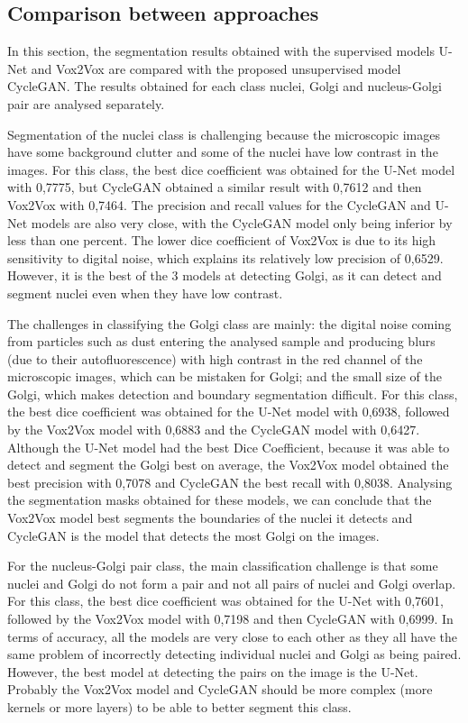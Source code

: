 \subsection{Comparison between approaches}

In this section, the segmentation results obtained with the supervised models U-Net and Vox2Vox are compared with the proposed unsupervised model CycleGAN. The results obtained for each class nuclei, Golgi and nucleus-Golgi pair are analysed separately.

Segmentation of the nuclei class is challenging because the microscopic images have some background clutter and some of the nuclei have low contrast in the images. For this class, the best dice coefficient was obtained for the U-Net model with 0,7775, but CycleGAN obtained a similar result with 0,7612 and then Vox2Vox with 0,7464. The precision and recall values for the CycleGAN and U-Net models are also very close, with the CycleGAN model only being inferior by less than one percent. The lower dice coefficient of Vox2Vox is due to its high sensitivity to digital noise, which explains its relatively low precision of 0,6529. However, it is the best of the 3 models at detecting Golgi, as it can detect and segment nuclei even when they have low contrast.

The challenges in classifying the Golgi class are mainly: the digital noise coming from particles such as dust entering the analysed sample and producing blurs (due to their autofluorescence) with high contrast in the red channel of the microscopic images, which can be mistaken for Golgi; and the small size of the Golgi, which makes detection and boundary segmentation difficult. For this class, the best dice coefficient was obtained for the U-Net model with 0,6938, followed by the Vox2Vox model with 0,6883 and the CycleGAN model with 0,6427. Although the U-Net model had the best Dice Coefficient, because it was able to detect and segment the Golgi best on average, the Vox2Vox model obtained the best precision with 0,7078 and CycleGAN the best recall with 0,8038. Analysing the segmentation masks obtained for these models, we can conclude that the Vox2Vox model best segments the boundaries of the nuclei it detects and CycleGAN is the model that detects the most Golgi on the images.

For the nucleus-Golgi pair class, the main classification challenge is that some nuclei and Golgi do not form a pair and not all pairs of nuclei and Golgi overlap. For this class, the best dice coefficient was obtained for the U-Net with 0,7601, followed by the Vox2Vox model with 0,7198 and then CycleGAN with 0,6999. In terms of accuracy, all the models are very close to each other as they all have the same problem of incorrectly detecting individual nuclei and Golgi as being paired. However, the best model at detecting the pairs on the image is the U-Net. Probably the Vox2Vox model and CycleGAN should be more complex (more kernels or more layers) to be able to better segment this class.

